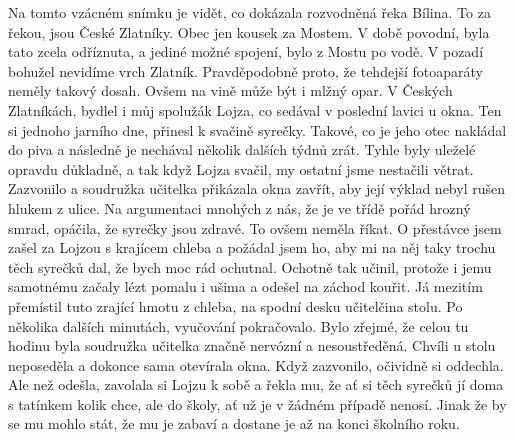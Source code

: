 
Na tomto vzácném snímku je vidět, co dokázala rozvodněná řeka Bílina.
To za řekou, jsou České Zlatníky. Obec jen kousek za Mostem. V době
povodní, byla tato zcela odříznuta, a jediné možné spojení, bylo z
Mostu po vodě. V pozadí bohužel nevidíme vrch Zlatník. Pravděpodobně
proto, že tehdejší fotoaparáty neměly takový dosah. Ovšem na vině může
být i mlžný opar. V Českých Zlatníkách, bydlel i můj spolužák Lojza,
co sedával v poslední lavici u okna. Ten si jednoho jarního dne,
přinesl k svačině syrečky. Takové, co je jeho otec nakládal do piva a
následně je nechával několik dalších týdnů zrát. Tyhle byly uleželé
opravdu důkladně, a tak když Lojza svačil, my ostatní jsme nestačili
větrat. Zazvonilo a soudružka učitelka přikázala okna zavřít, aby její
výklad nebyl rušen hlukem z ulice. Na argumentaci mnohých z nás, že je
ve třídě pořád hrozný smrad, opáčila, že syrečky jsou zdravé. To ovšem
neměla říkat. O přestávce jsem zašel za Lojzou s krajícem chleba a
požádal jsem ho, aby mi na něj taky trochu těch syrečků dal, že bych
moc rád ochutnal. Ochotně tak učinil, protože i jemu samotnému začaly
lézt pomalu i ušima a odešel na záchod kouřit. Já mezitím přemístil
tuto zrající hmotu z chleba, na spodní desku učitelčina stolu. Po
několika dalších minutách, vyučování pokračovalo. Bylo zřejmé, že
celou tu hodinu byla soudružka učitelka značně nervózní a
nesoustředěná. Chvíli u stolu neposeděla a dokonce sama otevírala
okna. Když zazvonilo, očividně si oddechla. Ale než odešla, zavolala
si Lojzu k sobě a řekla mu, že ať si těch syrečků jí doma s tatínkem
kolik chce, ale do školy, ať už je v žádném případě nenosí. Jinak že
by se mu mohlo stát, že mu je zabaví a dostane je až na konci školního
roku.
